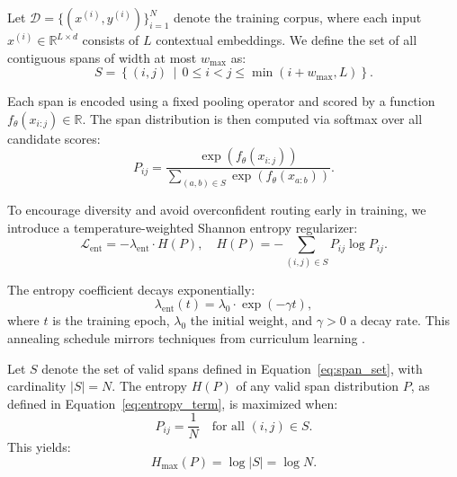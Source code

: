 Let \(\mathcal{D} = \{(x^{(i)}, y^{(i)})\}_{i=1}^N\) denote the training corpus, where each input \(x^{(i)} \in \mathbb{R}^{L \times d}\) consists of \(L\) contextual embeddings.
We define the set of all contiguous spans of width at most \(w_{\max}\) as:
\begin{equation}
S = \left\{(i,j) \,\middle|\, 0 \le i < j \le \min(i + w_{\max}, L) \right\}.
\label{eq:span_set}
\end{equation}

Each span is encoded using a fixed pooling operator and scored by a function \(f_\theta(x_{i:j}) \in \mathbb{R}\).
The span distribution is then computed via softmax over all candidate scores:
\begin{equation}
P_{ij} = \frac{\exp(f_\theta(x_{i:j}))}{\sum_{(a,b)\in S} \exp(f_\theta(x_{a:b}))}.
\label{eq:span_softmax}
\end{equation}

To encourage diversity and avoid overconfident routing early in training, we introduce a temperature-weighted Shannon entropy regularizer:
\begin{equation}
\mathcal{L}_{\mathrm{ent}} = -\lambda_{\mathrm{ent}} \cdot H(P), \quad
H(P) = -\sum_{(i,j)\in S} P_{ij} \log P_{ij}.
\label{eq:entropy_term}
\end{equation}

The entropy coefficient decays exponentially:
\begin{equation}
\lambda_{\mathrm{ent}}(t) = \lambda_0 \cdot \exp(-\gamma t),
\label{eq:entropy_decay}
\end{equation}
where \(t\) is the training epoch, \(\lambda_0\) the initial weight, and \(\gamma > 0\) a decay rate.
This annealing schedule mirrors techniques from curriculum learning \cite{raffel2020t5, kreutzer2021distilling}.

\begin{proposition}
\label{prop:span_entropy_bound}
Let \( S \) denote the set of valid spans defined in Equation~\eqref{eq:span_set}, with cardinality \( |S| = N \).
The entropy \(H(P)\) of any valid span distribution \(P\), as defined in Equation~\eqref{eq:entropy_term}, is maximized when:
\begin{equation}
P_{ij} = \frac{1}{N} \quad \text{for all } (i,j) \in S.
\label{eq:uniform_P}
\end{equation}
This yields:
\begin{equation}
H_{\max}(P) = \log |S| = \log N.
\label{eq:max_entropy}
\end{equation}
\end{proposition}

